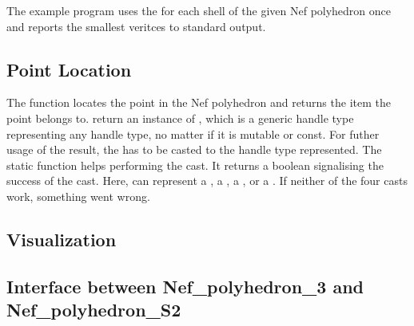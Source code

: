 The example program uses the  for each shell of the given
Nef polyhedron once and reports the smallest veritces to standard output.

\subsection{Point Location}

The function  locates the point  in the 
Nef polyhedron and returns the item the point belongs to. 
return an instance of , which is a generic handle
type representing any handle type, no matter if it is mutable or const. 
For futher usage of the result, the  has to be casted 
to the handle type represented. The static \cgal function 
helps performing the cast. It returns a boolean signalising the success
of the cast. Here,  can represent a 
, a , 
a , or a . If neither of
the four casts work, something went wrong.


\subsection{Visualization}


\subsection{Interface between Nef_polyhedron_3 and Nef_polyhedron_S2}


